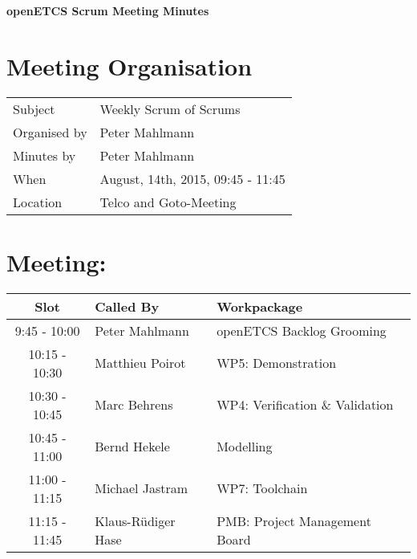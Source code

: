 \documentclass[a4paper, 11pt]{article}
\begin{document}
{\begin{center}\huge\bf openETCS Scrum Meeting Minutes\end{center}}
\section{Meeting Organisation}

\renewcommand{\arraystretch}{1.5}
\begin{supertabular}{m{.2\textwidth}m{.8\textwidth}}
Subject & Weekly Scrum of Scrums\\
Organised by & Peter Mahlmann\\
Minutes by & Peter Mahlmann\\
When & August, 14th, 2015, 09:45 - 11:45\\
Location & Telco and Goto-Meeting\\
\end{supertabular}

\renewcommand{\arraystretch}{1.0}
\section{Meeting:}

\begin{tabular}{|c|l|l|}
\hline
\textbf{Slot} &  \textbf{Called By} & \textbf{Workpackage} \\
\hline  
9:45 - 10:00 & Peter Mahlmann & openETCS Backlog Grooming  \\\hline
10:15 - 10:30 & Matthieu Poirot & WP5: Demonstration \\\hline  
10:30 - 10:45 & Marc Behrens & WP4: Verification \& Validation \\\hline 
10:45 - 11:00 & Bernd Hekele & Modelling \\\hline
11:00 - 11:15 & Michael Jastram  & WP7: Toolchain \\\hline
11:15 - 11:45 & Klaus-R\"udiger Hase & PMB: Project Management Board \\\hline  
\end{tabular}
\end{document}
